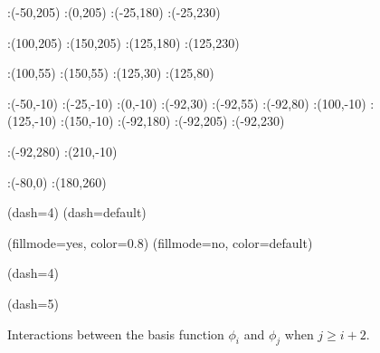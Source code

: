 {\begin{figure}[h]
:(-50,205) :(0,205)
:(-25,180) :(-25,230)

:(100,205) :(150,205)
:(125,180) :(125,230)

:(100,55) :(150,55)
:(125,30) :(125,80)

:(-50,-10) :(-25,-10) :(0,-10) 
:(-92,30) :(-92,55) :(-92,80) 
:(100,-10) :(125,-10) :(150,-10) 
:(-92,180) :(-92,205) :(-92,230) 

:(-92,280) :(210,-10)


:(-80,0) :(180,260)


\figdrawbegin{}
\figdrawarrow[1,2]
\figdrawarrow[3,4]
\figset(dash=4)
\figdrawline[5,6]
\figdrawline[7,8]
\figdrawline[9,10]
\figdrawline[11,12]
\figdrawline[13,14]
\figdrawline[15,16]
\figdrawline[17,18]
\figdrawline[19,20]
\figdrawline[21,22]
\figdrawline[23,24]
\figdrawline[25,26]
\figdrawline[27,28]
\figset(dash=default)

\figset(fillmode=yes, color=0.8)
\figdrawline[33,34,36,35,33]
\figdrawline[41,42,44,43,41]
\figset (fillmode=no, color=default)
\figdrawline[33,34,36,35,33]
\figdrawline[41,42,44,43,41]

\figset(dash=4)
\figdrawline[45,46]
\figdrawline[47,48]
\figdrawline[49,50]
\figdrawline[51,52]
\figdrawline[53,54]
\figdrawline[55,56]
\figdrawline[57,58]
\figdrawline[59,60]

\figset(dash=5)
\figdrawline[75,76]

\figdrawend

\centerline{\box\figBoxA}
\caption{Interactions between the basis function $\phi_i$ and $\phi_j$ when $j\geq i+2$.}\label{upp_tri}
\end{figure}


}
